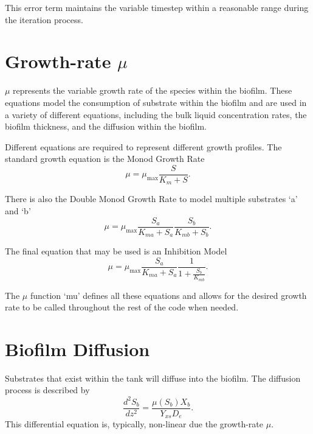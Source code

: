 \documentclass[letterpaper, twoside]{article}
\numberwithin{equation}{section}
\begin{document}
This error term maintains the variable timestep within a reasonable range during the iteration process.

\section{Growth-rate $\mu$}\label{sec:mu}
$\mu$ represents the variable growth rate of the species within the biofilm. These equations model the consumption of substrate within the biofilm and are used in a variety of different equations, including the bulk liquid concentration rates, the biofilm thickness, and the diffusion within the biofilm.

Different equations are required to represent different growth profiles. The standard growth equation is the Monod Growth Rate
\begin{equation} \label{eq: MonodGrowthRate}
  \mu=\mu_\mathrm{max} \frac{S}{K_m + S}.
\end{equation}

There is also the Double Monod Growth Rate to model multiple substrates `a' and `b'
\begin{equation} \label{eq: DoubleMonodGrowthRate}
  \mu=\mu_\mathrm{max} \frac{S_a}{K_{ma} + S_a} \frac{S_b}{K_{mb} + S_b}.
\end{equation}

The final equation that may be used is an Inhibition Model
\begin{equation} \label{eq: Inhibition}
  \mu=\mu_\mathrm{max} \frac{S_a}{K_{ma} + S_a} \frac{1}{1 + \frac{S_b}{K_{mb}}}.
\end{equation}

The $\mu$ function `mu' defines all these equations and allows for the desired growth rate to be called throughout the rest of the code when needed.
  

\section{Biofilm Diffusion}
Substrates that exist within the tank will diffuse into the biofilm.  The diffusion process is described by
\begin{equation} \label{eq:diffusion}
  \frac{d^2 S_b}{dz^2} = \frac{\mu(S_b) X_b}{Y_{xs} D_e}.
\end{equation}
This differential equation is, typically, non-linear due the growth-rate $\mu$.
\end{document}
